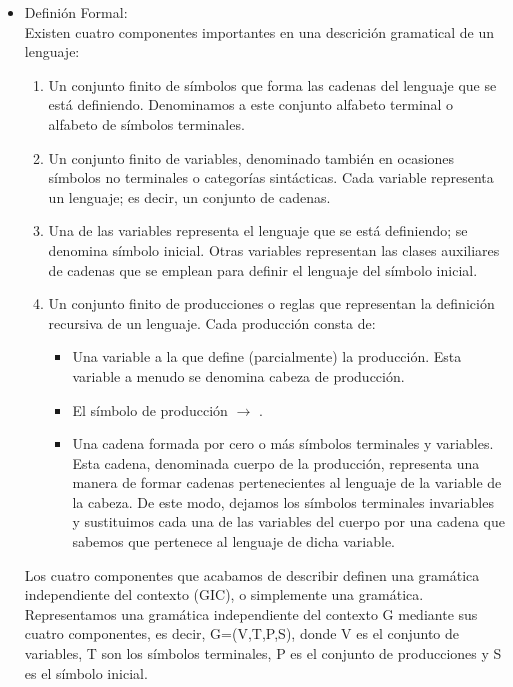 \documentclass[12pt,a4paper,spanish]{book}
\begin{document}
\begin{itemize}
\item Defini\'on Formal:\\
Existen cuatro componentes importantes en una descrici\'on gramatical de un lenguaje:
\begin{enumerate}
\item Un conjunto finito de s\'imbolos que forma las cadenas del lenguaje que se est\'a definiendo. Denominamos a este conjunto alfabeto terminal o alfabeto de s\'imbolos terminales.\\
\item Un conjunto finito de variables, denominado tambi\'en en ocasiones s\'imbolos no terminales o categor\'ias sint\'acticas. Cada variable representa un lenguaje; es decir, un conjunto de cadenas.\\
\item Una de las variables representa el lenguaje que se est\'a definiendo; se denomina s\'imbolo inicial. Otras variables representan las clases auxiliares de cadenas que se emplean para definir el lenguaje del s\'imbolo inicial.
\item Un conjunto finito de producciones o reglas que representan la definici\'on recursiva de un lenguaje. Cada producci\'on consta de:\\
\begin{itemize}
\item Una variable a la que define (parcialmente) la producci\'on. Esta variable a menudo se denomina cabeza de producci\'on.\\
\item El s\'imbolo de producci\'on $\rightarrow$ . \\
\item Una cadena formada por cero o m\'as s\'imbolos terminales y variables. Esta cadena, denominada cuerpo de la producci\'on, representa una manera de formar cadenas pertenecientes al lenguaje de la variable de la cabeza. De este modo, dejamos los s\'imbolos terminales invariables y sustituimos cada una de las variables del cuerpo por una cadena que sabemos que pertenece al lenguaje de dicha variable.\\
\end{itemize}
\end{enumerate}

Los cuatro componentes que acabamos de describir definen una gram\'atica independiente del contexto (GIC), o simplemente una gram\'atica. Representamos una gram\'atica independiente del contexto G mediante sus cuatro componentes, es decir, G=(V,T,P,S), donde V es el conjunto de variables, T son los s\'imbolos terminales, P es el conjunto de producciones y S es el s\'imbolo inicial.


\end{itemize}
\end{document}

